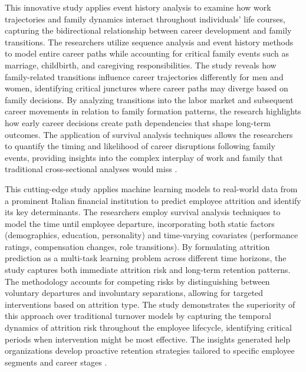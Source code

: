 \documentclass[../main.tex]{subfiles}
\begin{document}
This innovative study applies event history analysis to examine how work trajectories and family dynamics interact throughout individuals' life courses, capturing the bidirectional relationship between career development and family transitions. The researchers utilize sequence analysis and event history methods to model entire career paths while accounting for critical family events such as marriage, childbirth, and caregiving responsibilities. The study reveals how family-related transitions influence career trajectories differently for men and women, identifying critical junctures where career paths may diverge based on family decisions. By analyzing transitions into the labor market and subsequent career movements in relation to family formation patterns, the research highlights how early career decisions create path dependencies that shape long-term outcomes. The application of survival analysis techniques allows the researchers to quantify the timing and likelihood of career disruptions following family events, providing insights into the complex interplay of work and family that traditional cross-sectional analyses would miss \citep{vidal2023dynamic}.

This cutting-edge study applies machine learning models to real-world data from a prominent Italian financial institution to predict employee attrition and identify its key determinants. The researchers employ survival analysis techniques to model the time until employee departure, incorporating both static factors (demographics, education, personality) and time-varying covariates (performance ratings, compensation changes, role transitions). By formulating attrition prediction as a multi-task learning problem across different time horizons, the study captures both immediate attrition risk and long-term retention patterns. The methodology accounts for competing risks by distinguishing between voluntary departures and involuntary separations, allowing for targeted interventions based on attrition type. The study demonstrates the superiority of this approach over traditional turnover models by capturing the temporal dynamics of attrition risk throughout the employee lifecycle, identifying critical periods when intervention might be most effective. The insights generated help organizations develop proactive retention strategies tailored to specific employee segments and career stages \citep{attrition2025predicting}.
\end{document}
